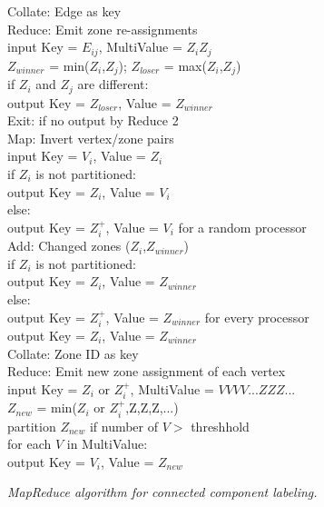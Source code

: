 \begin{figure}[htb]
\begin{center}
{\begin{minipage}{\textwidth}
\begin{tabbing}
 Collate: \> Edge as key \\
 Reduce: \> Emit zone re-assignments \\
       \> \> \> input Key = $E_{ij}$, MultiValue = $Z_i Z_j$ \\
       \> \> \> $Z_{winner}$ = min($Z_i$,$Z_j$); $Z_{loser}$ = max($Z_i$,$Z_j$) \\
       \> \> \> if $Z_i$ and $Z_j$ are different: \\
      \> \> \> \> output Key = $Z_{loser}$, Value = $Z_{winner}$ \\
 Exit: \> if no output by Reduce 2 \\
 Map: \> Invert vertex/zone pairs \\
    \> \> \> input Key = $V_i$, Value = $Z_i$ \\
    \> \> \> if $Z_i$ is not partitioned: \\
   \> \> \> \> output Key = $Z_i$, Value = $V_i$ \\
    \> \> \> else: \\
   \> \> \> \> output Key = $Z_i^+$, Value = $V_i$ for a random processor \\
 Add: \> Changed zones ($Z_i$,$Z_{winner}$) \\
    \> \> \> if $Z_i$ is not partitioned: \\
   \> \> \> \> output Key = $Z_i$, Value = $Z_{winner}$ \\
    \> \> \> else: \\
   \> \> \> \> output Key = $Z_i^+$, Value = $Z_{winner}$ for every processor \\
   \> \> \> \> output Key = $Z_i$, Value = $Z_{winner}$ \\
 Collate: \> Zone ID as key \\
 Reduce: \> Emit new zone assignment of each vertex \\
       \> \> \> input Key = $Z_i$ or $Z_i^+$, MultiValue = $V V V V ... Z Z Z ...$ \\
       \> \> \> $Z_{new}$ = min($Z_i$ or $Z_i^+$,Z,Z,Z,...) \\
       \> \> \> partition $Z_{new}$ if number of $V >$ threshhold \\
       \> \> \> for each $V$ in MultiValue: \\
      \> \> \> \> output Key = $V_i$, Value = $Z_{new}$

  \end{tabbing}
 \end{minipage}}\end{center}

 \caption{\it MapReduce algorithm for connected component labeling.}

 \label{fig:cc}
\end{figure}

